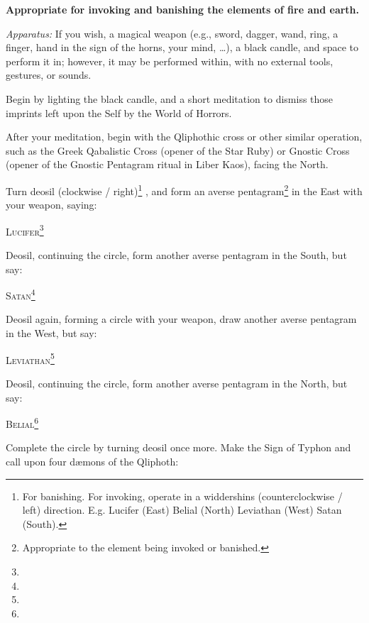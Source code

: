 
\textbf{Appropriate for invoking and banishing the elements of fire and earth.}

\textit{Apparatus:} If you wish, a magical weapon (e.g., sword, dagger, wand, ring, a finger, hand in the sign of the horns, your mind, …), a black candle, and space to perform it in; however, it may be performed within, with no external tools, gestures, or sounds.

Begin by lighting the black candle, and a short meditation to dismiss those imprints left upon the Self by the World of Horrors.

After your meditation, begin with the Qliphothic cross or other similar operation, such as the Greek Qabalistic Cross (opener of the Star Ruby) or Gnostic Cross (opener of the Gnostic Pentagram ritual in Liber Kaos), facing the North.


Turn deosil (clockwise / right)\footnote{For banishing. For invoking, operate in a widdershins (counterclockwise / left) direction. E.g. Lucifer (East) \textendash{} Belial (North) \textendash{} Leviathan (West) \textendash{} Satan (South).} , and form an averse pentagram\footnote{Appropriate to the element being invoked or banished.} in the East with your weapon, saying: \begin{quoting}
\textsc{Lucifer}\footnote{}
\end{quoting}

Deosil, continuing the circle, form another averse pentagram in the South, but say: \begin{quoting}
\textsc{Satan}\footnote{}
\end{quoting}

Deosil again, forming a circle with your weapon, draw another averse pentagram in the West, but say: \begin{quoting}
\textsc{Leviathan}\footnote{}
\end{quoting}

Deosil, continuing the circle, form another averse pentagram in the North, but say: \begin{quoting}
\textsc{Belial}\footnote{}
\end{quoting}

Complete the circle by turning deosil once more. Make the Sign of Typhon and call upon four d\ae{}mons of the Qliphoth:

